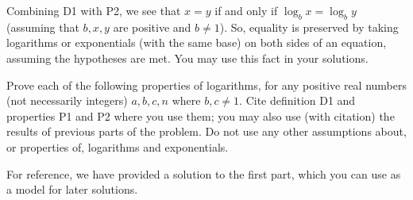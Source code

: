 \documentclass[11pt,addpoints,answers]{exam}
\begin{document}
\begin{questions}
  Combining D1 with P2, we see that $x=y$ if and only if $\log_{b} x = \log_{b} y$ (assuming that $b,x,y$ are positive and $b \neq 1$).
  So, equality is preserved by taking logarithms or exponentials (with the same base) on both sides of an equation, assuming the hypotheses are met. You may use this fact in your solutions.

  Prove each of the following properties of logarithms, for any positive real numbers (not necessarily integers) $a, b, c, n$ where $b, c \neq 1$.
  Cite definition D1 and properties P1 and P2 where you use them; you may also use (with citation) the results of previous parts of the problem. 
  Do not use any other assumptions about, or properties of, logarithms and exponentials.

  For reference, we have provided a solution to the first part, which you can use as a model for later solutions.
   
\end{questions}
\end{document}
